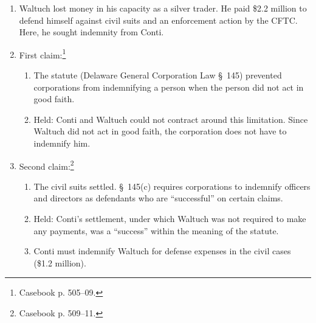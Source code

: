 \begin{enumerate}
    \item Waltuch lost money in his capacity as a silver trader. He paid \$2.2 
    million to defend himself against civil suits and an enforcement action by 
    the CFTC. Here, he sought indemnity from Conti.
    \item First claim:\footnote{Casebook p. 505--09.}
    \begin{enumerate}
        \item The statute (Delaware General Corporation Law \S\ 145) prevented 
        corporations from indemnifying a person when the person did not act 
        in good faith.
        \item Held: Conti and Waltuch could not contract around this 
        limitation. Since Waltuch did not act in good faith, the corporation 
        does not have to indemnify him.
    \end{enumerate}
    \item Second claim:\footnote{Casebook p. 509--11.}
    \begin{enumerate}
        \item The civil suits settled. \S\ 145(c) requires corporations to 
        indemnify officers and directors as defendants who are ``successful'' 
        on certain claims.
        \item Held: Conti's settlement, under which Waltuch was not required 
        to make any payments, was a ``success'' within the meaning of the 
        statute.
        \item Conti must indemnify Waltuch for defense expenses in the civil 
        cases (\$1.2 million).
    \end{enumerate}
\end{enumerate}
